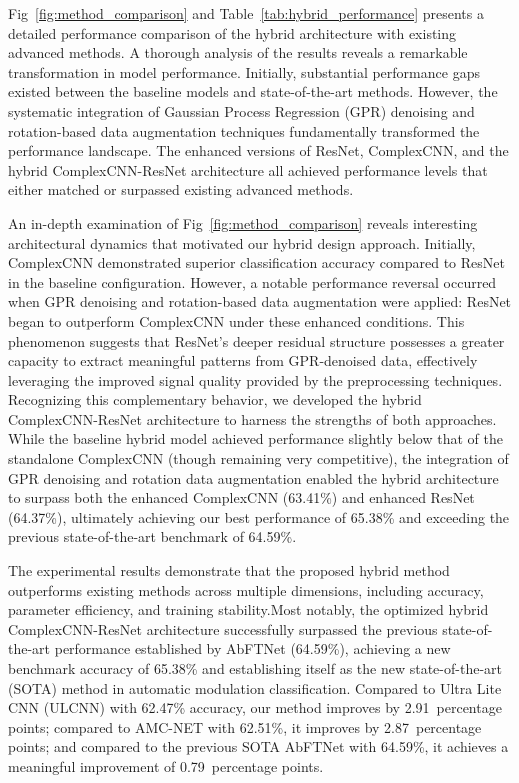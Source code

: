 \documentclass[conference]{IEEEtran}
\begin{document}
Fig~\ref{fig:method_comparison} and Table~\ref{tab:hybrid_performance} presents a detailed performance comparison of the hybrid architecture with existing advanced methods. A thorough analysis of the results reveals a remarkable transformation in model performance. Initially, substantial performance gaps existed between the baseline models and state-of-the-art methods. However, the systematic integration of Gaussian Process Regression (GPR) denoising and rotation-based data augmentation techniques fundamentally transformed the performance landscape. The enhanced versions of ResNet, ComplexCNN, and the hybrid ComplexCNN-ResNet architecture all achieved performance levels that either matched or surpassed existing advanced methods. 

An in-depth examination of Fig~\ref{fig:method_comparison} reveals interesting architectural dynamics that motivated our hybrid design approach. Initially, ComplexCNN demonstrated superior classification accuracy compared to ResNet in the baseline configuration. However, a notable performance reversal occurred when GPR denoising and rotation-based data augmentation were applied: ResNet began to outperform ComplexCNN under these enhanced conditions. This phenomenon suggests that ResNet's deeper residual structure possesses a greater capacity to extract meaningful patterns from GPR-denoised data, effectively leveraging the improved signal quality provided by the preprocessing techniques. Recognizing this complementary behavior, we developed the hybrid ComplexCNN-ResNet architecture to harness the strengths of both approaches. While the baseline hybrid model achieved performance slightly below that of the standalone ComplexCNN (though remaining very competitive), the integration of GPR denoising and rotation data augmentation enabled the hybrid architecture to surpass both the enhanced ComplexCNN (63.41\%) and enhanced ResNet (64.37\%), ultimately achieving our best performance of 65.38\% and exceeding the previous state-of-the-art benchmark of 64.59\%.

The experimental results demonstrate that the proposed hybrid method outperforms existing methods across multiple dimensions, including accuracy, parameter efficiency, and training stability.Most notably, the optimized hybrid ComplexCNN-ResNet architecture successfully surpassed the previous state-of-the-art performance established by AbFTNet (64.59\%), achieving a new benchmark accuracy of 65.38\% and establishing itself as the new state-of-the-art (SOTA) method in automatic modulation classification. Compared to Ultra Lite CNN (ULCNN) with 62.47\% accuracy, our method improves by 2.91~percentage points; compared to AMC-NET with 62.51\%, it improves by 2.87~percentage points; and compared to the previous SOTA AbFTNet with 64.59\%, it achieves a meaningful improvement of 0.79~percentage points.
\end{document}
